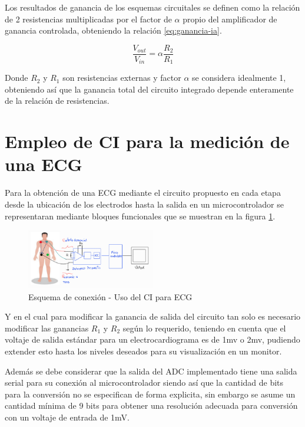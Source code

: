 \documentclass[conference]{IEEEtran}
\begin{document}
	Los resultados de ganancia de los esquemas circuitales se definen como la relación de 2 resistencias multiplicadas por el factor de $\alpha$ propio del amplificador de ganancia controlada, obteniendo la relación \ref{eq:ganancia-ia}.
	
	\begin{equation}
		\frac{V_{out}}{V_{in}} = \alpha\frac{R_2}{R_1}
		\label{eq:ganancia-ia}
	\end{equation}
	
	Donde $R_2$ y $R_1$ son resistencias externas y factor $\alpha$ se considera idealmente 1, obteniendo así que la ganancia total del circuito integrado depende enteramente de la relación de resistencias.
	
	\section{Empleo de CI para la medición de una ECG}
	
	Para la obtención de una ECG mediante el circuito propuesto en \cite{pantuprecharat2023ecg} cada etapa desde la ubicación de los electrodos hasta la salida en un microcontrolador se representaran mediante bloques funcionales que se muestran en la figura \ref{fig:esquema-conexion-uso}.
	
	\begin{figure}[h]
		\centering
		\includegraphics[width=0.5\textwidth]{media/esquema-conexion-uso}
		\caption{Esquema de conexión - Uso del CI para ECG}
		\label{fig:esquema-conexion-uso}
	\end{figure}
	
	Y en el cual para modificar la ganancia de salida del circuito tan solo es necesario modificar las ganancias $R_1$ y $R_2$ según lo requerido, teniendo en cuenta que el voltaje de salida estándar para un electrocardiograma es de 1mv o 2mv, pudiendo extender esto hasta los niveles deseados para su visualización en un monitor.
	
	Además se debe considerar que la salida del ADC implementado tiene una salida serial para su conexión al microcontrolador siendo así que la cantidad de bits para la conversión no se especifican de forma explicita, sin embargo se asume un cantidad mínima de 9 bits para obtener una resolución adecuada para conversión con un voltaje de entrada de 1mV.

	
	
	
\end{document}
